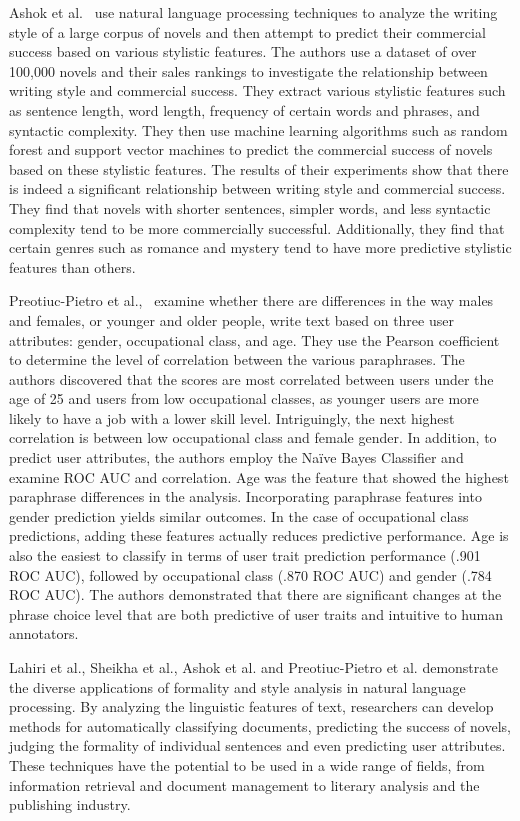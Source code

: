 \documentclass[akbc,twoside,11pt]{article}
\begin{document}
Ashok et al.~\cite{vikasnovels} use natural language processing techniques to analyze the writing style of a large corpus of novels and then attempt to predict their commercial success based on various stylistic features. The authors use a dataset of over 100,000 novels and their sales rankings to investigate the relationship between writing style and commercial success. They extract various stylistic features such as sentence length, word length, frequency of certain words and phrases, and syntactic complexity. They then use machine learning algorithms such as random forest and support vector machines to predict the commercial success of novels based on these stylistic features. The results of their experiments show that there is indeed a significant relationship between writing style and commercial success. They find that novels with shorter sentences, simpler words, and less syntactic complexity tend to be more commercially successful. Additionally, they find that certain genres such as romance and mystery tend to have more predictive stylistic features than others.

Preotiuc-Pietro et al.,~\cite{preotiuc2016discovering} examine whether there are differences in the way males and females, or younger and older people, write text based on three user attributes: gender, occupational class, and age. They use the Pearson coefficient to determine the level of correlation between the various paraphrases. The authors discovered that the scores are most correlated between users under the age of 25 and users from low occupational classes, as younger users are more likely to have a job with a lower skill level. Intriguingly, the next highest correlation is between low occupational class and female gender. In addition, to predict user attributes, the authors employ the Na\"{i}ve Bayes Classifier and examine ROC AUC and correlation. Age was the feature that showed the highest paraphrase differences in the analysis. Incorporating paraphrase features into gender prediction yields similar outcomes. In the case of occupational class predictions, adding these features actually reduces predictive performance. Age is also the easiest to classify in terms of user trait prediction performance (.901 ROC AUC), followed by occupational class (.870 ROC AUC) and gender (.784 ROC AUC). The authors demonstrated that there are significant changes at the phrase choice level that are both predictive of user traits and intuitive to human annotators.

Lahiri et al., Sheikha et al.,  Ashok et al. and Preotiuc-Pietro et al. demonstrate the diverse applications of formality and style analysis in natural language processing. By analyzing the linguistic features of text, researchers can develop methods for automatically classifying documents, predicting the success of novels, judging the formality of individual sentences and even predicting user attributes. These techniques have the potential to be used in a wide range of fields, from information retrieval and document management to literary analysis and the publishing industry.
\end{document}
